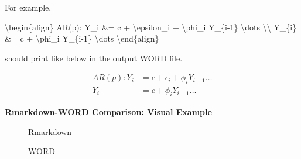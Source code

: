 \documentclass[
  letterpaper,
  DIV=11,
  numbers=noendperiod]{scrreprt}
\newenvironment{Shaded}{\begin{snugshade}}{\end{snugshade}}
\newcommand{\NormalTok}[1]{\textcolor[rgb]{0.00,0.23,0.31}{#1}}
\newcommand{\SpecialCharTok}[1]{\textcolor[rgb]{0.37,0.37,0.37}{#1}}
\begin{document}
For example,

\begin{Shaded}
\begin{Highlighting}[]
\NormalTok{\textbackslash{}begin\{align\}}
\NormalTok{ AR(p): Y\_i \&= c + \textbackslash{}epsilon\_i + \textbackslash{}phi\_i Y\_\{i{-}1\} \textbackslash{}dots }\SpecialCharTok{\textbackslash{}\textbackslash{}}
\NormalTok{ Y\_\{i\} \&= c + \textbackslash{}phi\_i Y\_\{i{-}1\} \textbackslash{}dots}
\NormalTok{\textbackslash{}end\{align\}}
\end{Highlighting}
\end{Shaded}

should print like below in the output WORD file.

\[
\begin{align}
 AR(p): Y_i &= c + \epsilon_i + \phi_i Y_{i-1} \dots \\
 Y_{i} &= c + \phi_i Y_{i-1} \dots
\end{align}
\]

\begin{tcolorbox}[enhanced jigsaw, colframe=quarto-callout-note-color-frame, breakable, left=2mm, toprule=.15mm, colback=white, arc=.35mm, rightrule=.15mm, bottomrule=.15mm, opacityback=0, leftrule=.75mm]

\textbf{Rmarkdown-WORD Comparison: Visual Example}\vspace{2mm}

\begin{figure}[H]

\begin{minipage}[t]{\linewidth}

{\centering 


\caption{Rmarkdown}

}

\end{minipage}%
\newline
\begin{minipage}[t]{\linewidth}

{\centering 


\caption{WORD}

}

\end{minipage}%

\end{figure}

\end{tcolorbox}
\end{document}
